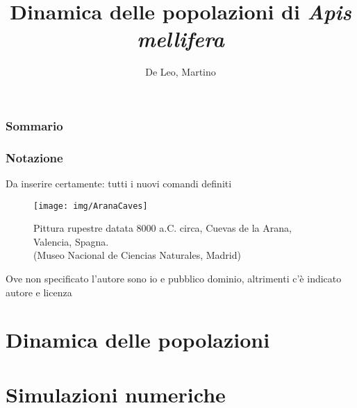 \documentclass[12pt,a4paper,oneside,hidelinks]{book} %
\author{De Leo, Martino}
\title{Dinamica delle popolazioni di \emph{Apis mellifera} }
\begin{document}
\maketitle %

\frontmatter

\section*{Sommario}


\section*{Notazione}
Da inserire certamente: tutti i nuovi comandi definiti

\begin{figure}[hbp]
    \centering
    \texttt{[image: img/AranaCaves]}

    \caption[Pittura rupestre di Arana.]{Pittura rupestre datata 8000 a.C. circa, Cuevas de la Arana, Valencia, Spagna. \\ (Museo Nacional de Ciencias Naturales, Madrid)}
    \label{img:arana}
\end{figure}

\cleardoublepage

\tableofcontents
\listoffigures
Ove non specificato l'autore sono io e pubblico dominio, altrimenti c'è indicato autore e licenza
\listoftables


\mainmatter

\clearpage
\part{Dinamica delle popolazioni}







\part{Simulazioni numeriche}






\appendix




\backmatter

\cleardoublepage
{}
\nocite{*} %
\printbibliography
\end{document}
